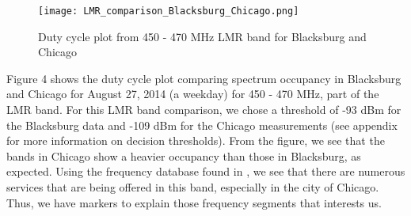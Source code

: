 \documentclass[12pt,sts]{report}
\begin{document}
		\begin{figure}[ht!]
			\centering
				\texttt{[image: LMR\_comparison\_Blacksburg\_Chicago.png]}
			\caption{Duty cycle plot from 450 - 470 MHz LMR band for Blacksburg and Chicago}
		\end{figure}
		
		Figure 4 shows the duty cycle plot comparing spectrum occupancy in Blacksburg and Chicago for August 27, 2014 (a weekday) for 450 - 470 MHz, part of the LMR band. For this LMR band comparison, we chose a threshold of -93 dBm for the Blacksburg data and -109 dBm for the Chicago measurements (see appendix for more information on decision thresholds). From the figure, we see that the bands in Chicago show a heavier occupancy than those in Blacksburg, as expected. Using the frequency database found in \cite{chicago_spec_occ} \cite{blacksburg_spec_occ}, we see that there are numerous services that are being offered in this band, especially in the city of Chicago. Thus, we have markers to explain those frequency segments that interests us.
		
\end{document}
